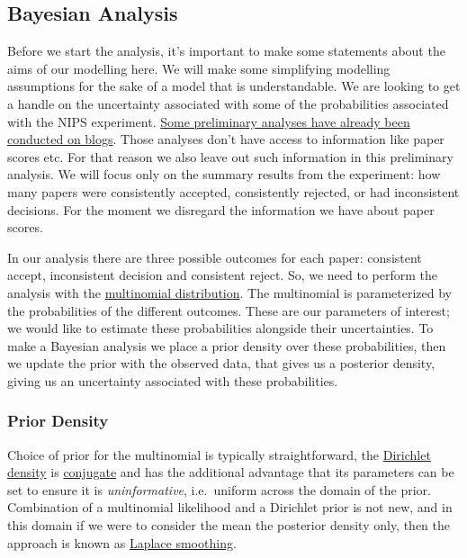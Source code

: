 \hypertarget{bayesian-analysis}{%
\subsection{Bayesian Analysis}\label{bayesian-analysis}}

Before we start the analysis, it's important to make some statements
about the aims of our modelling here. We will make some simplifying
modelling assumptions for the sake of a model that is understandable. We
are looking to get a handle on the uncertainty associated with some of
the probabilities associated with the NIPS experiment.
\href{http://inverseprobability.com/2015/01/16/blogs-on-the-nips-experiment/}{Some
preliminary analyses have already been conducted on blogs}. Those
analyses don't have access to information like paper scores etc. For
that reason we also leave out such information in this preliminary
analysis. We will focus only on the summary results from the experiment:
how many papers were consistently accepted, consistently rejected, or
had inconsistent decisions. For the moment we disregard the information
we have about paper scores.

In our analysis there are three possible outcomes for each paper:
consistent accept, inconsistent decision and consistent reject. So, we
need to perform the analysis with the
\href{http://en.wikipedia.org/wiki/Multinomial_distribution}{multinomial
distribution}. The multinomial is parameterized by the probabilities of
the different outcomes. These are our parameters of interest; we would
like to estimate these probabilities alongside their uncertainties. To
make a Bayesian analysis we place a prior density over these
probabilities, then we update the prior with the observed data, that
gives us a posterior density, giving us an uncertainty associated with
these probabilities.

\hypertarget{prior-density}{%
\subsubsection{Prior Density}\label{prior-density}}

Choice of prior for the multinomial is typically straightforward, the
\href{http://en.wikipedia.org/wiki/Dirichlet_distribution}{Dirichlet
density} is
\href{http://en.wikipedia.org/wiki/Conjugate_prior}{conjugate} and has
the additional advantage that its parameters can be set to ensure it is
\emph{uninformative}, i.e.~uniform across the domain of the prior.
Combination of a multinomial likelihood and a Dirichlet prior is not
new, and in this domain if we were to consider the mean the posterior
density only, then the approach is known as
\href{http://en.wikipedia.org/wiki/Additive_smoothing}{Laplace
smoothing}.

